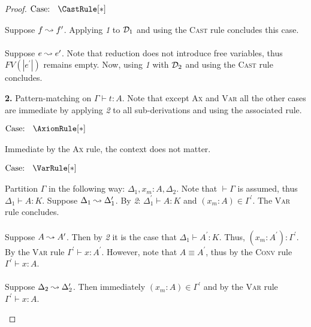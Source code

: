\begin{proof}
    $\text{Case: }\begin{array}{c} \CastRule[*] \end{array}$
    \begin{proofcase}
        Suppose $f \leadsto f^\prime$.
        Applying \textit{1} to $\mathcal{D}_{1}$ and using the \textsc{Cast} rule concludes this case.
        \\ \\
        Suppose $e \leadsto e^\prime$.
        Note that reduction does not introduce free variables, thus $FV(|e^\prime|)$ remains empty.
        Now, using \textit{1} with $\mathcal{D}_{2}$ and using the \textsc{Cast} rule concludes.
    \end{proofcase}

    \noindent \textbf{2.} Pattern-matching on $\Gamma \vdash t : A$.
    Note that except \textsc{Ax} and \textsc{Var} all the other cases are immediate by applying \textit{2} to all sub-derivations and using the associated rule.

    $\text{Case: }\begin{array}{c} \AxiomRule[*] \end{array}$
    \begin{proofcase}
        Immediate by the \textsc{Ax} rule, the context does not matter.
    \end{proofcase}

    $\text{Case: }\begin{array}{c} \VarRule[*] \end{array}$
    \begin{proofcase}
        Partition $\Gamma$ in the following way: $\Delta_1, x_m : A, \Delta_2$.
        Note that $\vdash \Gamma$ is assumed, thus $\Delta_1 \vdash A : K$.
        Suppose $\Delta_1 \leadsto \Delta_1^\prime$.
        By \textit{2}: $\Delta_1^\prime \vdash A : K$ and $(x_m : A) \in \Gamma^\prime$.
        The \textsc{Var} rule concludes.
        \\ \\
        Suppose $A \leadsto A^\prime$.
        Then by \textit{2} it is the case that $\Delta_1 \vdash A^\prime : K$.
        Thus, $(x_m : A^\prime) : \Gamma^\prime$.
        By the \textsc{Var} rule $\Gamma^\prime \vdash x : A^\prime$.
        However, note that $A \equiv A^\prime$, thus by the \textsc{Conv} rule $\Gamma^\prime \vdash x : A$.
        \\ \\
        Suppose $\Delta_2 \leadsto \Delta_2^\prime$.
        Then immediately $(x_m : A) \in \Gamma^\prime$ and by the \textsc{Var} rule $\Gamma^\prime \vdash x : A$.
    \end{proofcase}


\end{proof}
